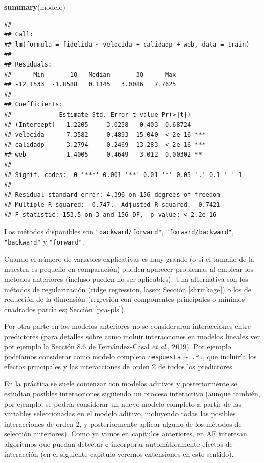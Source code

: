 \documentclass[
]{book}
\newenvironment{Shaded}{\begin{snugshade}}{\end{snugshade}}
\newcommand{\KeywordTok}[1]{\textcolor[rgb]{0.13,0.29,0.53}{\textbf{#1}}}
\newcommand{\NormalTok}[1]{#1}
\theoremstyle{break}
\theoremstyle{definition}
\theoremstyle{definition}
\theoremstyle{definition}
\theoremstyle{remark}
\begin{document}
\begin{Shaded}
\begin{Highlighting}[]
\KeywordTok{summary}\NormalTok{(modelo)}
\end{Highlighting}
\end{Shaded}

\begin{verbatim}
## 
## Call:
## lm(formula = fidelida ~ velocida + calidadp + web, data = train)
## 
## Residuals:
##      Min       1Q   Median       3Q      Max 
## -12.1533  -1.8588   0.1145   3.0086   7.7625 
## 
## Coefficients:
##             Estimate Std. Error t value Pr(>|t|)    
## (Intercept)  -1.2205     3.0258  -0.403  0.68724    
## velocida      7.3582     0.4893  15.040  < 2e-16 ***
## calidadp      3.2794     0.2469  13.283  < 2e-16 ***
## web           1.4005     0.4649   3.012  0.00302 ** 
## ---
## Signif. codes:  0 '***' 0.001 '**' 0.01 '*' 0.05 '.' 0.1 ' ' 1
## 
## Residual standard error: 4.396 on 156 degrees of freedom
## Multiple R-squared:  0.747,  Adjusted R-squared:  0.7421 
## F-statistic: 153.5 on 3 and 156 DF,  p-value: < 2.2e-16
\end{verbatim}

Los métodos disponibles son \texttt{"backward/forward"}, \texttt{"forward/backward"}, \texttt{"backward"} y \texttt{"forward"}.

Cuando el número de variables explicativas es muy grande (o si el tamaño de la muestra es pequeño en comparación) pueden aparecer problemas al emplear los métodos anteriores (incluso pueden no ser aplicables).
Una alternativa son los métodos de regularización (ridge regression, lasso; Sección \ref{shrinkage}) o los de reducción de la dimensión (regresión con componentes principales o mínimos cuadrados parciales; Sección \ref{pca-pls}).

Por otra parte en los modelos anteriores no se consideraron interacciones entre predictores (para detalles sobre como incluir interacciones en modelos lineales ver por ejemplo la \href{https://rubenfcasal.github.io/intror/modelos-lineales.html\#interacciones}{Sección 8.6} de Fernández-Casal \emph{et al}., 2019).
Por ejemplo podríamos considerar como modelo completo \texttt{respuesta\ \textasciitilde{}\ .*.}, que incluiría los efectos principales y las interacciones de orden 2 de todos los predictores.

En la práctica se suele comenzar con modelos aditivos y posteriormente se estudian posibles interacciones siguiendo un proceso interactivo (aunque también, por ejemplo, se podría considerar un nuevo modelo completo a partir de las variables seleccionadas en el modelo aditivo, incluyendo todas las posibles interacciones de orden 2, y posteriormente aplicar alguno de los métodos de selección anteriores).
Como ya vimos en capítulos anteriores, en AE interesan algoritmos que puedan detectar e incorporar automáticamente efectos de interacción (en el siguiente capítulo veremos extensiones en este sentido).
\end{document}

